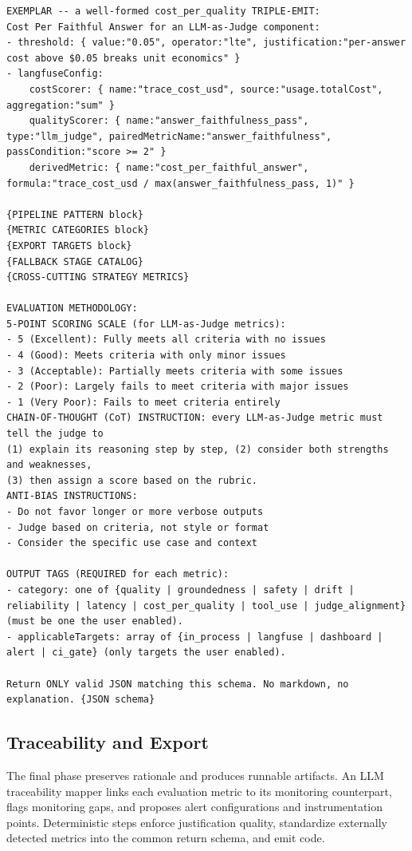 \documentclass[11pt]{article}
\begin{document}
\begin{lstlisting}[style=prompt]
EXEMPLAR -- a well-formed cost_per_quality TRIPLE-EMIT:
Cost Per Faithful Answer for an LLM-as-Judge component:
- threshold: { value:"0.05", operator:"lte", justification:"per-answer cost above $0.05 breaks unit economics" }
- langfuseConfig:
    costScorer: { name:"trace_cost_usd", source:"usage.totalCost", aggregation:"sum" }
    qualityScorer: { name:"answer_faithfulness_pass", type:"llm_judge", pairedMetricName:"answer_faithfulness", passCondition:"score >= 2" }
    derivedMetric: { name:"cost_per_faithful_answer", formula:"trace_cost_usd / max(answer_faithfulness_pass, 1)" }

{PIPELINE PATTERN block}
{METRIC CATEGORIES block}
{EXPORT TARGETS block}
{FALLBACK STAGE CATALOG}
{CROSS-CUTTING STRATEGY METRICS}

EVALUATION METHODOLOGY:
5-POINT SCORING SCALE (for LLM-as-Judge metrics):
- 5 (Excellent): Fully meets all criteria with no issues
- 4 (Good): Meets criteria with only minor issues
- 3 (Acceptable): Partially meets criteria with some issues
- 2 (Poor): Largely fails to meet criteria with major issues
- 1 (Very Poor): Fails to meet criteria entirely
CHAIN-OF-THOUGHT (CoT) INSTRUCTION: every LLM-as-Judge metric must tell the judge to
(1) explain its reasoning step by step, (2) consider both strengths and weaknesses,
(3) then assign a score based on the rubric.
ANTI-BIAS INSTRUCTIONS:
- Do not favor longer or more verbose outputs
- Judge based on criteria, not style or format
- Consider the specific use case and context

OUTPUT TAGS (REQUIRED for each metric):
- category: one of {quality | groundedness | safety | drift | reliability | latency | cost_per_quality | tool_use | judge_alignment} (must be one the user enabled).
- applicableTargets: array of {in_process | langfuse | dashboard | alert | ci_gate} (only targets the user enabled).

Return ONLY valid JSON matching this schema. No markdown, no explanation. {JSON schema}
\end{lstlisting}


\subsection{Traceability and Export}
\label{app:impl-export}

The final phase preserves rationale and produces runnable artifacts. An LLM traceability mapper links each evaluation metric to its monitoring counterpart, flags monitoring gaps, and proposes alert configurations and instrumentation points. Deterministic steps enforce justification quality, standardize externally detected metrics into the common return schema, and emit code.
\end{document}
